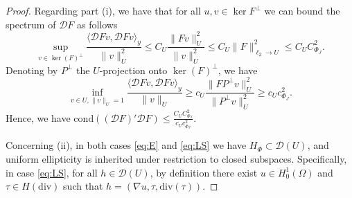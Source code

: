 \documentclass[10pt,a4paper]{amsart}
\begin{document}
\begin{proof}
%
Regarding part (i), 
%
%
we have that for all $u,v \in \ker{F}^\perp$ we can bound the spectrum of $\mathcal DF$ as follows
\[
\sup_{v\in \ker( F)^\perp}\frac{\langle \mathcal DFv,\mathcal DFv\rangle_y}{\|v\|_U^2}\leq  C_{U}\frac{\| Fv\|^2_{U}}{\|v\|^2_{U}%
} \leq C_{U} \|F\|^2_{\ell_2\to U}\leq C_{U}C^2_{\Phi_J}.
 \]
Denoting by $P^\perp$ the $U$-projection onto $\ker(F)^\perp$, we have   
\[
\inf_{v\in U,\|v\|_U=1}\frac{\langle \mathcal DFv,\mathcal DFv\rangle_y}{\|v\|_U} \geq c_U\frac{ \|F P^\perp v\|^2_{U}}{\|P^\perp v\|^2_{U}} \geq c_{U} c^2_{\Phi_J}.
\]
Hence, we have $\mathrm{cond}((\mathcal D F)'\mathcal DF)\leq \frac{C_UC^2_{\Phi_J}}{c_Uc^2_{\Phi_J}}$.

Concerning (ii), in both cases \eqref{eq:E} and \eqref{eq:LS} we have
 $H_\Phi\subset \mathcal D (U)$, and uniform ellipticity is inherited under restriction to closed subspaces.
 Specifically, in case \eqref{eq:LS}, 
   for all $h\in\mathcal D(U)$, by definition there exist $u\in H^1_0(\Omega)$ and $\tau\in H(\mathrm{div})$ such that $h = (\nabla u,\tau,\mathrm{div}(\tau))$.
\end{proof}
\end{document}
